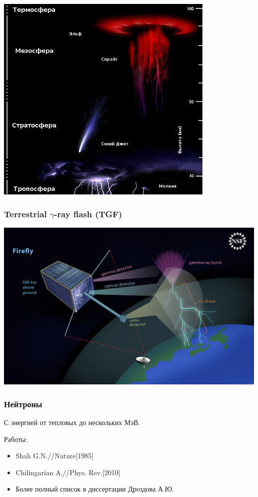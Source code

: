 \documentclass[10pt,pdf,hyperref={unicode}]{beamer}
\begin{document}
\begin{frame}
\begin{center}
\includegraphics[width=0.6\paperwidth]{image/fig01.jpg}
\end{center}
\end{frame}
 


\begin{frame}
\frametitle{Terrestrial $\gamma$-ray flash (TGF)}
\begin{center}
\includegraphics[width=0.8\paperwidth]{image/fig02.jpg}
\end{center}
\end{frame}


\begin{frame}
\frametitle{Нейтроны}
С энергией от тепловых до нескольких МэВ.
\begin{block}{Работы:}
\begin{itemize}
\item Shah G.N.//Nature[1985]
\item Chilingarian A,//Phys. Rev.[2010]
\item Более полный список в диссертации Дроздова А.Ю.
\end{itemize}
\end{block}
\end{frame}
\end{document}
